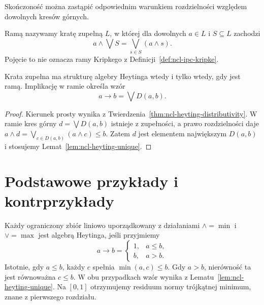 Skończoność można zastąpić odpowiednim warunkiem
rozdzielności względem dowolnych kresów górnych.

\begin{definicja}
\label{def:ncl-heyting-frame}
Ramą nazywamy kratę zupełną $L$, w której dla
dowolnych $a\in L$ i $S\subseteq L$ zachodzi
\[
 a\wedge\bigvee S=\bigvee_{s\in S}(a\wedge s).
\]
Pojęcie to nie oznacza ramy Kripkego
z Definicji~\ref{def:ncl-ipc-kripke}.
\end{definicja}

\begin{wniosek}
\label{cor:ncl-heyting-frames}
Krata zupełna ma strukturę algebry Heytinga
wtedy i tylko wtedy, gdy jest ramą.
Implikację w ramie określa wzór
\[
 a\to b=\bigvee D(a,b).
\]
\end{wniosek}
\begin{proof}
Kierunek prosty wynika z
Twierdzenia~\ref{thm:ncl-heyting-distributivity}.
W ramie kres górny $d=\bigvee D(a,b)$ istnieje
z zupełności, a prawo rozdzielności daje
$a\wedge d=\bigvee_{c\in D(a,b)}(a\wedge c)\leq b$.
Zatem $d$ jest elementem największym $D(a,b)$
i stosujemy Lemat~\ref{lem:ncl-heyting-unique}.
\end{proof}

\section{Podstawowe przykłady i kontrprzykłady}

\begin{przyklad}
\label{ex:ncl-heyting-chain}
Każdy ograniczony zbiór liniowo uporządkowany
z działaniami $\wedge=\min$ i $\vee=\max$
jest algebrą Heytinga, jeśli przyjmiemy
\[
 a\to b=
 \begin{cases}
  1,&a\leq b,\\
  b,&a>b.
 \end{cases}
\]
Istotnie, gdy $a\leq b$, każdy $c$ spełnia
$\min(a,c)\leq b$. Gdy $a>b$, nierówność ta
jest równoważna $c\leq b$. W obu przypadkach
wzór wynika z Lematu~\ref{lem:ncl-heyting-unique}.
Na $[0,1]$ otrzymujemy residuum normy trójkątnej
minimum, znane z pierwszego rozdziału.
\end{przyklad}


